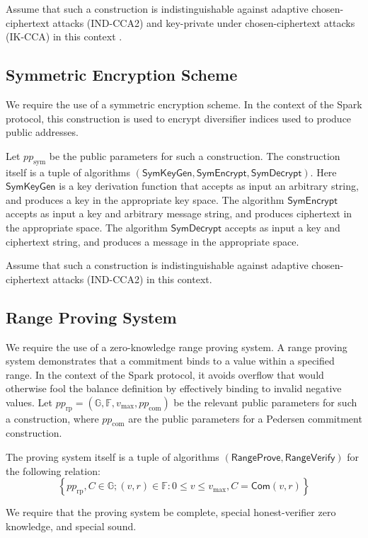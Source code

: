 \documentclass{llncs}
\newcommand{\G}{\mathbb{G}}
\newcommand{\F}{\mathbb{F}}
\newcommand{\func}[1]{\mathsf{#1}}
\newcommand{\com}{\func{Com}}
\begin{document}
Assume that such a construction is indistinguishable against adaptive chosen-ciphertext attacks (IND-CCA2) and key-private under chosen-ciphertext attacks (IK-CCA) in this context \cite{keyprivacy}.


\subsection{Symmetric Encryption Scheme}

We require the use of a symmetric encryption scheme.
In the context of the Spark protocol, this construction is used to encrypt diversifier indices used to produce public addresses.

Let $pp_{\text{sym}}$ be the public parameters for such a construction.
The construction itself is a tuple of algorithms $(\func{SymKeyGen},\func{SymEncrypt},\func{SymDecrypt})$.
Here $\func{SymKeyGen}$ is a key derivation function that accepts as input an arbitrary string, and produces a key in the appropriate key space.
The algorithm $\func{SymEncrypt}$ accepts as input a key and arbitrary message string, and produces ciphertext in the appropriate space.
The algorithm $\func{SymDecrypt}$ accepts as input a key and ciphertext string, and produces a message in the appropriate space.

Assume that such a construction is indistinguishable against adaptive chosen-ciphertext attacks (IND-CCA2) in this context.


\subsection{Range Proving System}

We require the use of a zero-knowledge range proving system.
A range proving system demonstrates that a commitment binds to a value within a specified range.
In the context of the Spark protocol, it avoids overflow that would otherwise fool the balance definition by effectively binding to invalid negative values.
Let $pp_{\text{rp}} = (\G, \F, v_{\text{max}}, pp_{\text{com}})$ be the relevant public parameters for such a construction, where $pp_{\text{com}}$ are the public parameters for a Pedersen commitment construction.

The proving system itself is a tuple of algorithms $(\func{RangeProve},\func{RangeVerify})$ for the following relation:
$$\left\{ pp_{\text{rp}}, C \in \G ; (v, r) \in \F : 0 \leq v \leq v_{\text{max}}, C = \com(v,r) \right\}$$

We require that the proving system be complete, special honest-verifier zero knowledge, and special sound.
\end{document}
